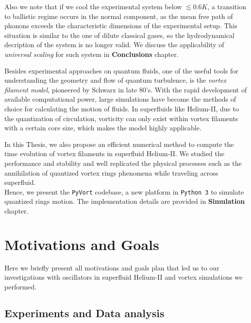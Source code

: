 	Also we note that if we cool the experimental system below $\lesssim 0.6\unit{K}$, a transition to ballistic regime occurs in the normal component, as the mean free path of phonons exceeds the characteristic dimensions of the experimental setup. This situation is similar to the one of dilute classical gases, so the hydrodynamical decription of the system is no longer valid. We discuss the applicability of \textit{universal scaling} for such system in \textbf{Conclusions} chapter.

	Besides experimental approaches on quantum fluids, one of the useful tools for understanding the geometry and flow of quantum turbulence, is the \textit{vortex filament model}, pioneered by Schwarz \cite{schwarz} in late 80's. With the rapid development of available computational power, large simulations have become the methods of choice for calculating the motion of fluids. In superfluids like Helium-II, due to the quantization of circulation, vorticity can only exist within vortex filaments with a certain core size, which makes the model highly applicable.

	In this Thesis, we also propose an efficient numerical method to compute the time evolution of vortex filaments in superfluid Helium-II. We studied the performance and stability and well replicated the physical processes such as the annihilation of quantized vortex rings \cite{vortex_ring} phenomena while traveling across superfluid.\\
	Hence, we present the \texttt{PyVort} codebase, a new platform in \texttt{Python 3} to simulate quantized rings motion. The implementation details are provided in \textbf{Simulation} chapter.


	\section*{Motivations and Goals}

	Here we briefly present all motivations and goals plan that led us to our investigations with oscillators in superfluid Helium-II and vortex simulations we performed.

	\subsection*{Experiments and Data analysis}

